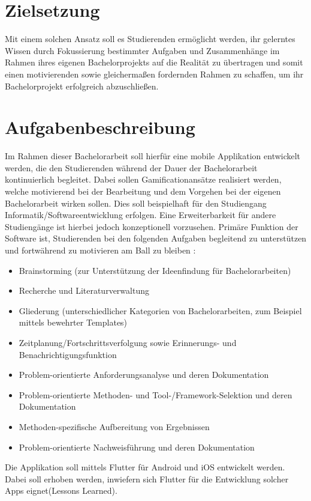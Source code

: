 \documentclass[bibliography=totoc,listof=totoc,BCOR=5mm,DIV=12,oneside]{scrbook}
\begin{document}
\section{Zielsetzung}
Mit einem solchen Ansatz soll es Studierenden ermöglicht werden, ihr gelerntes Wissen durch Fokussierung bestimmter Aufgaben und Zusammenhänge im Rahmen ihres eigenen Bachelorprojekts auf die Realität zu übertragen und somit einen motivierenden sowie gleichermaßen fordernden Rahmen zu schaffen, um ihr Bachelorprojekt erfolgreich abzuschließen.

\section{Aufgabenbeschreibung}
Im Rahmen dieser Bachelorarbeit soll hierfür eine mobile Applikation entwickelt werden, die den Studierenden während der Dauer der Bachelorarbeit kontinuierlich \qquad begleitet\qquad . Dabei sollen Gamificationansätze realisiert werden, welche motivierend bei der Bearbeitung und dem Vorgehen bei der eigenen Bachelorarbeit wirken sollen. Dies soll beispielhaft für den Studiengang Informatik/Softwareentwicklung erfolgen. Eine Erweiterbarkeit für andere Studiengänge ist hierbei jedoch konzeptionell vorzusehen.
Primäre Funktion der Software ist, Studierenden bei den folgenden Aufgaben begleitend zu unterstützen und fortwährend zu motivieren \qquad am Ball zu bleiben \qquad :
\begin{itemize}
\item Brainstorming (zur Unterstützung der Ideenfindung für Bachelorarbeiten)
\item Recherche und Literaturverwaltung
\item Gliederung (unterschiedlicher Kategorien von Bachelorarbeiten, zum Beispiel mittels bewehrter Templates)
\item Zeitplanung/Fortschrittsverfolgung sowie Erinnerungs- und Benachrichtigungsfunktion 
\item Problem-orientierte Anforderungsanalyse und deren Dokumentation
\item Problem-orientierte Methoden- und Tool-/Framework-Selektion und deren Dokumentation
\item Methoden-spezifische Aufbereitung von Ergebnissen
\item Problem-orientierte Nachweisführung und deren Dokumentation
\end{itemize}
Die Applikation soll mittels Flutter für Android und iOS entwickelt werden. Dabei soll erhoben werden, inwiefern sich Flutter für die Entwicklung solcher Apps eignet(Lessons Learned). 
\end{document}
